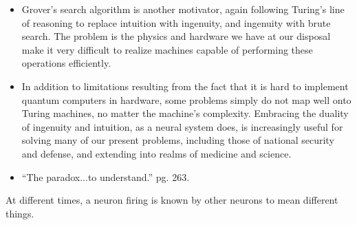 \documentclass[twocolumn]{article}
\begin{document}
\begin{itemize}
\item Grover's search algorithm is another motivator, again following Turing's line of reasoning to replace intuition with ingenuity, and ingenuity with brute search. The problem is the physics and hardware we have at our disposal make it very difficult to realize machines capable of performing these operations efficiently. 
\item In addition to limitations resulting from the fact that it is hard to implement quantum computers in hardware, some problems simply do not map well onto Turing machines, no matter the machine's complexity. Embracing the duality of ingenuity and intuition, as a neural system does, is increasingly useful for solving many of our present problems, including those of national security and defense, and extending into realms of medicine and science.
\item ``The paradox...to understand.'' \cite{dy2012} pg. 263.
\end{itemize}


\vspace{2em}
At different times, a neuron firing is known by other neurons to mean different things.

\end{document}
